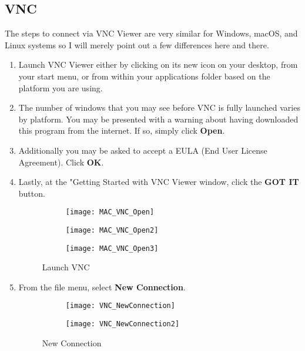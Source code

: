 \documentclass[
a4paper,
fontsize=14pt, %
pagesize, %
parskip=half-, %
]{scrartcl} %
\theoremstyle{mythmstyle} %
\begin{document}
\subsection{VNC}
The steps to connect via VNC Viewer are very similar for Windows, macOS, and Linux systems so I will merely point out a few differences here and there.
\begin{enumerate}
    \item Launch VNC Viewer either by clicking on its new icon on your desktop, from your start menu, or from within your applications folder based on the platform you are using.
    \item The number of windows that you may see before VNC is fully launched varies by platform.  You may be presented with a warning about having downloaded this program from the internet.  If so, simply click \textbf{Open}.
    \item Additionally you may be asked to accept a EULA (End User License Agreement).  Click \textbf{OK}.
    \item Lastly, at the "Getting Started with VNC Viewer window, click the \textbf{GOT IT} button.
    \begin{figure}[h]
        \begin{subfigure}{.3\textwidth}
            \centering\texttt{[image: MAC\_VNC\_Open]} 
        \end{subfigure}
        \begin{subfigure}{.3\textwidth}
            \centering\texttt{[image: MAC\_VNC\_Open2]}
        \end{subfigure}
        \begin{subfigure}{.3\textwidth}
            \centering\texttt{[image: MAC\_VNC\_Open3]}
        \end{subfigure}
        \caption{Launch VNC}
    \end{figure}
    \clearpage
    \item From the file menu, select \textbf{New Connection}.
    \begin{figure}[h]
        \begin{subfigure}{.4\textwidth}
            \centering\texttt{[image: VNC\_NewConnection]} 
        \end{subfigure}
        \begin{subfigure}{.6\textwidth}
            \centering\texttt{[image: VNC\_NewConnection2]}
        \end{subfigure}
        \caption{New Connection}

\end{figure}
\end{enumerate}
\end{document}
